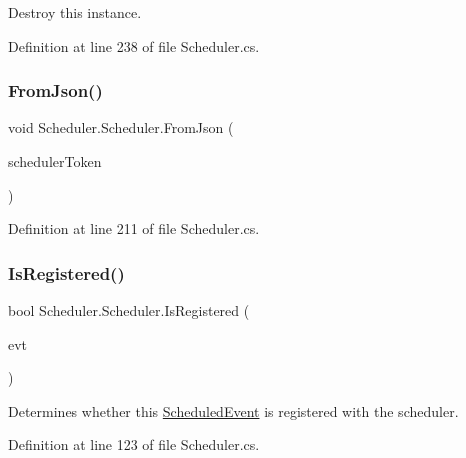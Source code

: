 Destroy this instance. 



Definition at line 238 of file Scheduler.\+cs.

\mbox{\label{class_scheduler_1_1_scheduler_a45a216c36b720e5f1bae0796aeae0f36}} 
\subsubsection{\texorpdfstring{From\+Json()}{FromJson()}}
{\footnotesize\ttfamily void Scheduler.\+Scheduler.\+From\+Json (\begin{DoxyParamCaption}\item[{J\+Token}]{scheduler\+Token }\end{DoxyParamCaption})}



Definition at line 211 of file Scheduler.\+cs.

\mbox{\label{class_scheduler_1_1_scheduler_a53ebcf4526da0f018a1012cd79f82ff4}} 
\subsubsection{\texorpdfstring{Is\+Registered()}{IsRegistered()}}
{\footnotesize\ttfamily bool Scheduler.\+Scheduler.\+Is\+Registered (\begin{DoxyParamCaption}\item[{\hyperlink{class_scheduler_1_1_scheduled_event}{Scheduled\+Event}}]{evt }\end{DoxyParamCaption})}



Determines whether this \hyperlink{class_scheduler_1_1_scheduled_event}{Scheduled\+Event} is registered with the scheduler. 



Definition at line 123 of file Scheduler.\+cs.

\mbox{\label{class_scheduler_1_1_scheduler_a183dd5e7560cd9b70133eea57ef12acd}} 
